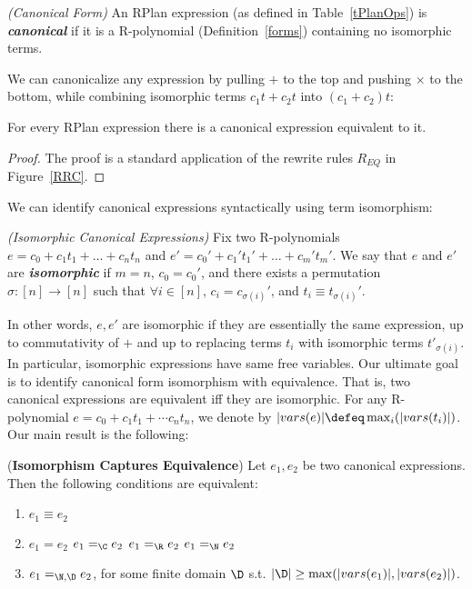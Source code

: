 \begin{defn}{\em (Canonical Form)} An RPlan expression (as defined in Table~\ref{tPlanOps}) is {\em \textbf{canonical}} if it is a R-polynomial (Definition~\ref{forms}) containing no isomorphic terms. 
\end{defn}{}

We can canonicalize any expression by pulling $+$ to the top and pushing $\times$ to the bottom, while combining isomorphic terms $c_1 t + c_2 t$ into $(c_1 + c_2) t$: 

\begin{lmm}\label{lCanonPreservesSemantics}
For every RPlan expression there is a canonical expression equivalent to it. 
\end{lmm}{}
\begin{proof}
The proof is a standard application of the rewrite rules $R_{EQ}$ in Figure~\ref{RRC}. 
\end{proof}{}

We can identify canonical expressions syntactically using term isomorphism: 

\begin{defn}{\em (Isomorphic Canonical Expressions)} 
  Fix two R-polynomials $e = c_0 + c_1 t_1 + \dots + c_n t_n$ and $e' = c_0' + c_1' t_1' + \dots + c_m' t_m'$.  We say that $e$ and $e'$ are \emph{\textbf{isomorphic}} if $m=n$, $c_0=c_0'$, and there exists a permutation $\sigma: [n] \rightarrow [n]$ such that $\forall i \in [n]$, $c_i = c_{\sigma(i)}'$, and $t_i \equiv t_{\sigma(i)}'$.
\end{defn}{}

In other words, $e, e'$ are isomorphic if they are essentially the same expression, up to commutativity of $+$ and up to replacing terms $t_i$ with isomorphic terms $t'_{\sigma(i)}$.  In particular,  isomorphic expressions have same free variables.
Our ultimate goal is to identify canonical form isomorphism with equivalence. That is, two canonical expressions are equivalent iff they are isomorphic. For any R-polynomial $e = c_0 + c_1t_1 + \cdots c_nt_n$, we denote by $|vars(e)| \defeq \max_i(|vars(t_i)|)$.  Our main result is the following:

\begin{thm}{(\textbf{Isomorphism Captures Equivalence})}\label{lemma:unique:nf} Let $e_1, e_2$ be two  canonical expressions.  Then the following conditions are equivalent:
  \begin{enumerate}
\itemsep0em
  \item \label{item:1} $e_1 \equiv e_2$ 
  \item \label{item:2} $e_1 = e_2$
  \inlineitem \label{item:3} $e_1 =_\C e_2$
  \inlineitem \label{item:4} $e_1 =_\R e_2$
  \inlineitem \label{item:5} $e_1 =_\N e_2$
  \item \label{item:6} $e_1 =_{\N, \D} e_2$, for some finite domain $\D$ s.t. $|\D| \geq \max(|vars(e_1)|, |vars(e_2)|)$. 
  \end{enumerate}
\end{thm}{}

